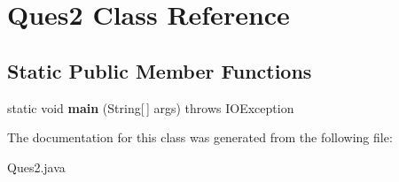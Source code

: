 \hypertarget{class_ques2}{}\section{Ques2 Class Reference}
\label{class_ques2}
\subsection*{Static Public Member Functions}
\begin{DoxyCompactItemize}
\item 
\mbox{\label{class_ques2_ad62b714627e36092db4ae72b57204437}} 
static void {\bfseries main} (String\mbox{[}$\,$\mbox{]} args)  throws I\+O\+Exception
\end{DoxyCompactItemize}


The documentation for this class was generated from the following file\+:\begin{DoxyCompactItemize}
\item 
Ques2.\+java\end{DoxyCompactItemize}

